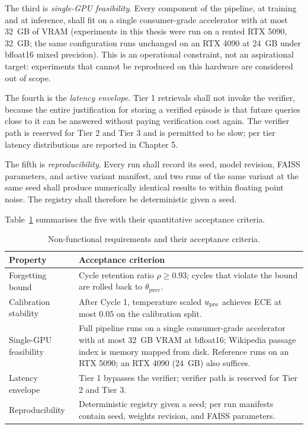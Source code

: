 The third is \emph{single-GPU feasibility}. Every component of the pipeline, at training and at inference, shall fit on a single consumer-grade accelerator with at most 32~GB of VRAM (experiments in this thesis were run on a rented RTX 5090, 32~GB; the same configuration runs unchanged on an RTX 4090 at 24~GB under bfloat16 mixed precision). This is an operational constraint, not an aspirational target: experiments that cannot be reproduced on this hardware are considered out of scope.

The fourth is the \emph{latency envelope}. Tier 1 retrievals shall not invoke the verifier, because the entire justification for storing a verified episode is that future queries close to it can be answered without paying verification cost again. The verifier path is reserved for Tier 2 and Tier 3 and is permitted to be slow; per tier latency distributions are reported in Chapter 5.

The fifth is \emph{reproducibility}. Every run shall record its seed, model revision, FAISS parameters, and active variant manifest, and two runs of the same variant at the same seed shall produce numerically identical results to within floating point noise. The registry shall therefore be deterministic given a seed.

Table~\ref{tab:nfr} summarises the five with their quantitative acceptance criteria.

\begin{table}[H]
\centering
\caption{Non-functional requirements and their acceptance criteria.}
\label{tab:nfr}
\small
\begin{tabular}{@{}p{3.4cm}p{10.2cm}@{}}
\toprule
\textbf{Property} & \textbf{Acceptance criterion} \\
\midrule
Forgetting bound         & Cycle retention ratio $\rho \geq 0.93$; cycles that violate the bound are rolled back to $\theta_{\mathrm{prev}}$. \\
Calibration stability    & After Cycle 1, temperature scaled $u_{\text{pre}}$ achieves ECE at most $0.05$ on the calibration split. \\
Single-GPU feasibility   & Full pipeline runs on a single consumer-grade accelerator with at most 32~GB VRAM at bfloat16; Wikipedia passage index is memory mapped from disk. Reference runs on an RTX 5090; an RTX 4090 (24~GB) also suffices. \\
Latency envelope         & Tier 1 bypasses the verifier; verifier path is reserved for Tier 2 and Tier 3. \\
Reproducibility          & Deterministic registry given a seed; per run manifests contain seed, weights revision, and FAISS parameters. \\
\bottomrule
\end{tabular}
\end{table}

